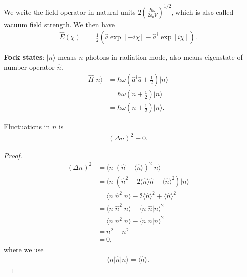 \documentclass[../../note.tex]{subfiles}
\begin{document}
We write the field operator in natural units $2 \left(\frac{\hbar \omega}{2 \varepsilon_0 V}\right)^{1/2}$, which is also called vacuum field strength. We then have
\begin{align}
    \hat{E}(\chi)
    &= \frac{1}{2} \left(\hat{a}\exp[-i \chi] - \hat{a}^\dagger \exp[i \chi] \right).
\end{align}

\textbf{Fock states}: $\vert n \rangle$ means $n$ photons in radiation mode, also means eigenstate of number operator $\hat{n}$.
\begin{align}
    \hat{H} \vert n \rangle
    &= \hbar \omega(\hat{a}^\dagger \hat{a} + \frac{1}{2}) \vert n \rangle \\
    &= \hbar\omega(\hat{n} + \frac{1}{2}) \vert n \rangle \\
    &= \hbar \omega (n + \frac{1}{2}) \vert n \rangle.
\end{align}

\begin{lemma}
    Fluctuations in $n$ is
    \begin{align}
        (\Delta n)^2 = 0.
    \end{align}
\end{lemma}
\begin{proof}
    \begin{align}
        (\Delta n)^2
        &= \langle n \vert (\hat{n} - \langle \hat{n} \rangle)^2 \vert n \rangle \\
        &= \langle n \vert (\hat{n}^2 - 2 \langle \hat{n} \rangle \hat{n} + \langle \hat{n} \rangle^2)\vert n \rangle \\
        &= \langle n \vert \hat{n}^2 \vert n \rangle - 2 \langle \hat{n} \rangle^2 + \langle \hat{n} \rangle^2 \\
        &= \langle n \vert \hat{n}^2 \vert n \rangle - \langle n \vert \hat{n} \vert n \rangle^2 \\
        &= \langle n \vert n^2 \vert n \rangle - \langle n \vert n \vert n \rangle^2 \\
        &= n^2 - n^2 \\
        &= 0,
    \end{align}
    where we use
    \begin{align}
        \langle n \vert \hat{n} \vert n \rangle = \langle \hat{n} \rangle.
    \end{align}
\end{proof}
\end{document}
